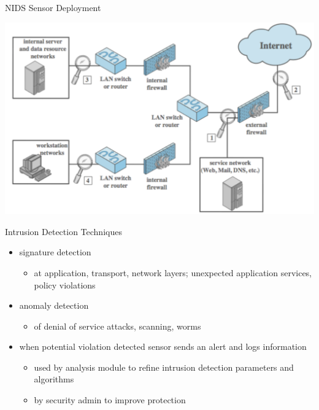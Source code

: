 \documentclass{beamer}
\begin{document}
\begin{frame}{NIDS Sensor Deployment}
   \begin{center}
    \includegraphics[width=0.9\linewidth]{nids}
  \end{center}
\end{frame}

\begin{frame}{Intrusion Detection Techniques}
  \begin{itemize}
  \item signature detection 
    \begin{itemize}
    \item at application, transport, network layers; unexpected 
      application services, policy violations 
    \end{itemize}
  \item anomaly detection 
    \begin{itemize}
    \item of denial of service attacks, scanning, worms 
    \end{itemize}
  \item when potential violation detected sensor sends an 
    alert and logs information 
    \begin{itemize}
    \item used by analysis module to refine intrusion detection 
      parameters and algorithms 
    \item by security admin to improve protection
    \end{itemize}
  \end{itemize}
\end{frame}
\end{document}
